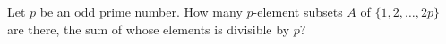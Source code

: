Let $ p$ be an odd prime number. How many $ p$-element subsets $ A$ of $ \{1,2,\dots,2p\}$ are there, the sum of whose elements is divisible by $ p$?